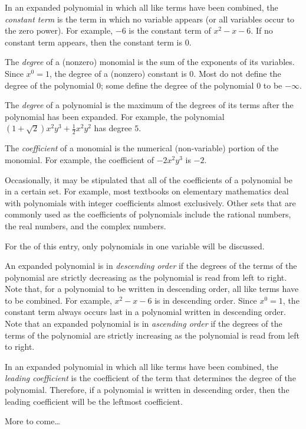 \documentclass[12pt]{article}
\begin{document}
In an expanded polynomial in which all like terms have been combined, the \emph{constant term} is the term in which no variable appears (or all variables occur to the zero power).  For example, $-6$ is the constant term of $x^2-x-6$.  If no constant term appears, then the constant term is $0$.

The \emph{degree} of a (nonzero) monomial is the sum of the exponents of its variables.  Since $x^0=1$, the degree of a (nonzero) constant is $0$.  Most  do not define the degree of the polynomial $0$; some define the degree of the polynomial $0$ to be $-\infty$.

The \emph{degree} of a polynomial is the maximum of the degrees of its terms after the polynomial has been expanded.  For example, the polynomial $(1+\sqrt{2})x^2y^3+\frac{1}{2}x^2y^2$ has degree $5$.

The \emph{coefficient} of a monomial is the numerical (non-variable) portion of the monomial.  For example, the coefficient of $-2x^2y^3$ is $-2$.

Occasionally, it may be stipulated that all of the coefficients of a polynomial be in a certain set.  For example, most textbooks on elementary mathematics deal with polynomials with integer coefficients almost exclusively.  Other sets that are commonly used as the coefficients of polynomials include the rational numbers, the real numbers, and the complex numbers.

For the  of this entry, only polynomials in one variable will be discussed.

An expanded polynomial is in \emph{descending order} if the degrees of the terms of the polynomial are strictly decreasing as the polynomial is read from left to right.  Note that, for a polynomial to be written in descending order, all like terms have to be combined.  For example, $x^2-x-6$ is in descending order.  Since $x^0=1$, the constant term always occurs last in a polynomial written in descending order.  Note that an expanded polynomial is in \emph{ascending order} if the degrees of the terms of the polynomial are strictly increasing as the polynomial is read from left to right.

In an expanded polynomial in which all like terms have been combined, the \emph{leading coefficient} is the coefficient of the term that determines the degree of the polynomial.  Therefore, if a polynomial is written in descending order, then the leading coefficient will be the leftmost coefficient.

More to come\dots
\end{document}
